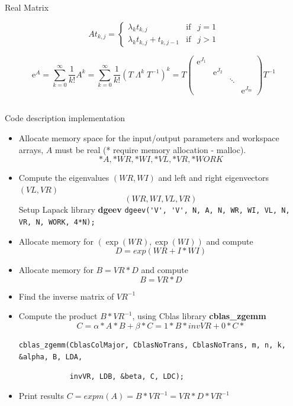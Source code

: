 \documentclass[xcolor=x11names,compress]{beamer}
\renewcommand{\(}{\begin{columns}}
\renewcommand{\)}{\end{columns}}
\newcommand{\<}[1]{\begin{column}{#1}}
\renewcommand{\>}{\end{column}}
\begin{document}
\begin{frame}{Real Matrix}
\begin{tiny}
\[At_{k,j} = \left\{ \begin{array}{lcc}
\lambda_k t_{k,j}            &    \mbox{if}  & j=1  \\
\lambda_k t_{k,j} +t_{k,j-1} &    \mbox{if}  & j>1  \end{array} \right.\] 

\[\mathrm{e}^A = \displaystyle\sum_{k=0}^{\infty}\frac{1}{k!} A^k =  \displaystyle\sum_{k=0}^{\infty}\frac{1}{k!} \left(T\;\Lambda^k\; T^{-1}\right)^k 
= T \left(\begin{array}{cccc}
\mathrm{e}^{J_1} &           &  & \\
          & \mathrm{e}^{J_2} &  & \\
          &           & \ddots & \\          
          &           &  & \mathrm{e}^{J_m} \end{array} \right) T^{-1}\]   
          
\end{tiny} 
          
\end{frame}
\subsection{}
\begin{frame}[fragile]{Code description implementation}
\begin{scriptsize}
\begin{itemize}
 \item Allocate memory space for the input/output parameters and workspace arrays, $A$ must be real (* require memory allocation -  malloc).
 \[*A, *WR, *WI, *VL, *VR,  *WORK \] 
 \item Compute the eigenvalues $(WR, WI)$ and left and right eigenvectors $(VL, VR)$
 \[(WR,WI,VL,VR)\]
 Setup Lapack library \textbf{dgeev}
 \verb+dgeev('V', 'V', N, A, N, WR, WI, VL, N, VR, N, WORK, 4*N); + 
 \item Allocate memory for $(\exp(WR), \exp(WI))$ and  compute \[D = exp(WR + I*WI)\]
 \item Allocate memory for $B = VR*D$ and  compute  \[B = VR*D\]
 \item Find the inverse matrix of $VR^{-1}$
 \item Compute the product $B*VR^{-1}$, using Cblas library \textbf{cblas\_zgemm}
 \[C =  \alpha*A*B + \beta*C = 1*B*invVR + 0*C*\]
\begin{tiny}\verb+cblas_zgemm(CblasColMajor, CblasNoTrans, CblasNoTrans, m, n, k, &alpha, B, LDA,+ \end{tiny}
\begin{tiny}\verb+            invVR, LDB, &beta, C, LDC);+ \end{tiny}
 \item Print results $C = expm(A) = B*VR^{-1} = VR*D*VR^{-1}$
\end{itemize}\end{scriptsize}
\end{frame}
\end{document}
